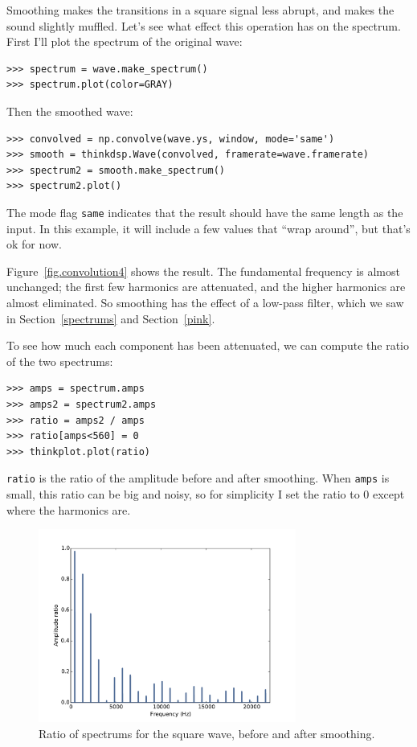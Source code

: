 \documentclass[12pt]{book}
\begin{document}
Smoothing makes the transitions in a square signal less abrupt,
and makes the sound slightly muffled.  Let's see what effect this
operation has on the spectrum.  First I'll plot the spectrum
of the original wave:

\begin{verbatim}
>>> spectrum = wave.make_spectrum()
>>> spectrum.plot(color=GRAY)
\end{verbatim}

Then the smoothed wave:

\begin{verbatim}
>>> convolved = np.convolve(wave.ys, window, mode='same')
>>> smooth = thinkdsp.Wave(convolved, framerate=wave.framerate)
>>> spectrum2 = smooth.make_spectrum()
>>> spectrum2.plot()
\end{verbatim}

The mode flag {\tt same} indicates that the result should have the
same length as the input.  In this example, it will include a few values
that ``wrap around'', but that's ok for now.

Figure~\ref{fig.convolution4} shows the result.  The fundamental
frequency is almost unchanged; the first few harmonics are
attenuated, and the higher harmonics are almost eliminated.  So
smoothing has the effect of a low-pass filter, which we
saw in Section~\ref{spectrums} and Section~\ref{pink}.

To see how much each component has been attenuated, we can
compute the ratio of the two spectrums:

\begin{verbatim}
>>> amps = spectrum.amps
>>> amps2 = spectrum2.amps
>>> ratio = amps2 / amps    
>>> ratio[amps<560] = 0
>>> thinkplot.plot(ratio)
\end{verbatim}

{\tt ratio} is the ratio of the amplitude before and after 
smoothing.  When {\tt amps} is small, this ratio can be big
and noisy, so for simplicity I set the ratio to 0 except
where the harmonics are.

\begin{figure}
\centerline{\includegraphics[height=2.5in]{figs/convolution5.pdf}}
\caption{Ratio of spectrums for the square wave, before and after smoothing.}
\label{fig.convolution5}
\end{figure}
\end{document}
